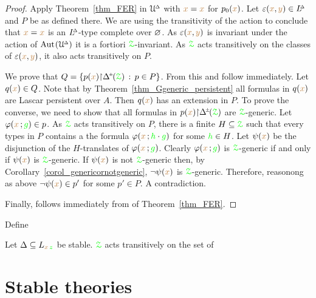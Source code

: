 \begin{proof}
  Apply Theorem~\ref{thm_FER} in $\EuScript U\kern-.2ex^{\scriptscriptstyle\Delta}$ with ${\color{brown} x}={\color{brown} x}$ for $p_0({\color{brown} x})$.
  Let $\varepsilon({\color{brown} x},{\color{brown} y})\in L\kern-.5ex^{\scriptscriptstyle\Delta}$ and $P$ be as defined there.
  We are using the transitivity of the action to conclude that ${\color{brown} x}={\color{brown} x}$ is an $L\kern-.5ex^{\scriptscriptstyle\Delta}$-type complete over $\varnothing$.
  As $\varepsilon({\color{brown} x},{\color{brown} y})$ is invariant under the action of ${\rm Aut\kern.15ex}(\EuScript U\kern-.2ex^{\scriptscriptstyle\Delta})$ it is a fortiori ${\color{green}\EuScript Z}$-invariant.
  As ${\color{green}\EuScript Z}$ acts transitively on the classes of $\varepsilon({\color{brown} x},{\color{brown} y})$, it also acts transitively on $P$.

  We prove that $Q=\{p({\mr x}){\restriction}\pmDelta(\grZ)\, :\, p\in P\}$.
  From this  and  follow immediately.
  Let $q({\color{brown} x})\in Q$. Note that by Theorem~\ref{thm_Ggeneric_persistent} all formulas in $q({\color{brown} x})$ are Lascar persistent over $A$.
  Then $q({\color{brown} x})$ has an extension in $P$.
  To prove the converse, we need to show that all formulas in $p({\mr x}){\restriction}\pmDelta(\grZ)$ are ${\color{green}\EuScript Z}$-generic.
  Let $\varphi({\color{brown} x}\,;{\color{green} g})\in p$.
  As ${\color{green}\EuScript Z}$ acts transitively on $P$, there is a finite $H\subseteq{\color{green}\EuScript Z}$ such that every types in $P$ contains a the formula $\varphi({\color{brown} x}\,;{\color{green} h}\cdot{\color{green}g})$ for some ${\color{green} h}\in H$.
  Let $\psi({\color{brown} x})$ be the disjunction of the $H$-translates of $\varphi({\color{brown} x}\,;{\color{green} g})$.
  Clearly $\varphi({\color{brown} x}\,;{\color{green} g})$ is ${\color{green}\EuScript Z}$-generic if and only if $\psi({\color{brown} x})$ is ${\color{green}\EuScript Z}$-generic.
  If $\psi({\color{brown} x})$ is not  ${\color{green}\EuScript Z}$-generic then, by Corollary~\ref{corol_genericornotgeneric}, $\neg\psi({\color{brown} x})$ is ${\color{green}\EuScript Z}$-generic.
  Therefore, reasonong as above $\neg\psi({\color{brown} x})\in p'$ for some $p'\in P$.
  A contradiction.

  Finally,  follows immediately from  of Theorem~\ref{thm_FER}.
\end{proof}

Define 



\begin{proposition}
  Let $\Delta\subseteq L_{{\color{brown} x}\,{\color{green} z}}$ be stable.
  ${\color{green}\EuScript Z}$ acts transitively on the set of 
\end{proposition}

\section{Stable theories}
\label{stable_theories}

